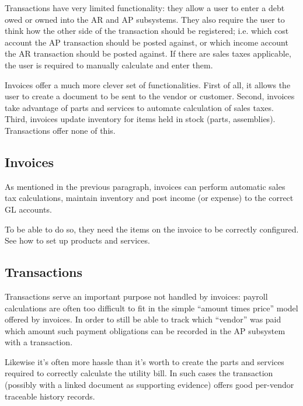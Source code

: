 Transactions have very limited functionality: they allow a user to enter
a debt owed or owned into the AR and AP subsystems. They also require the
user to think how the other side of the transaction should be registered;
i.e. which cost account the AP transaction should be posted against, or
which income account the AR transaction should be posted against. If there
are sales taxes applicable, the user is required to manually calculate and
enter them.

Invoices offer a much more clever set of functionalities. First of all, it
allows the user to create a document to be sent to the vendor or customer.
Second, invoices take advantage of parts and services
to automate calculation of sales taxes. Third, invoices update inventory
for items held in stock (parts, assemblies). Transactions offer none of this.

\subsection{Invoices}

As mentioned in the previous paragraph, invoices can perform automatic
sales tax calculations, maintain inventory and post income (or expense)
to the correct GL accounts.

To be able to do so, they need the items on the invoice to be correctly
configured. See  how to set up products
and services.


\subsection{Transactions}

Transactions serve an important purpose not handled by invoices: payroll
calculations are often too difficult to fit in the simple ``amount times price''
model offered by invoices. In order to still be able to track which ``vendor''
was paid which amount such payment obligations can be recorded in the AP subsystem
with a transaction.

Likewise it's often more hassle than it's worth to create the parts and services
required to correctly calculate the utility bill. In such cases the transaction
(possibly with a linked document as supporting evidence) offers good per-vendor
traceable history records.


